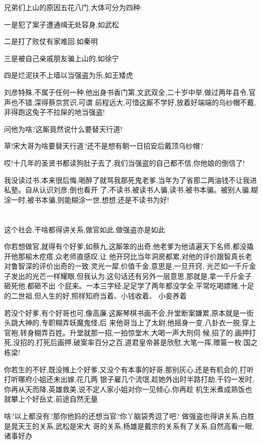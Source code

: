 ﻿\documentclass[12pt]{article}
\begin{document}
兄弟们上山的原因五花八门,大体可分为四种:

一是犯了案子遭通缉无处容身,如武松

二是打了败仗有家难回,如秦明

三是被自己亲戚朋友骗上山的,如徐宁

四是烂泥扶不上墙以当强盗为乐,如王矮虎

刘彦特殊,不属于任何一种,他出身书香门第,文武双全,二十岁中举,做过两年县令,官声也不错,深得蔡京赏识,可谓
前程远大,可惜这厮不学好,放着好端端的乌纱帽不戴,非得跑这兔子不拉屎的地当强盗!

问他为啥?这厮竟然说什么要替天行道!

草!宋大哥为啥要替天行道?还不是想有朝一日招安后戴顶乌纱帽?

哎!十几年的圣贤书都读狗肚子去了,我们当强盗的自己都不信,你他娘的倒信了!

我没读过书,本来很后悔,喝醉了就骂我那死鬼老爹,当年为了省那二两油钱不让我进私塾。自从认识刘彦,倒也看开
了,不读书,被读书人骗,读书,被书本骗。被别人骗,糊涂一时,被书本骗,则能糊涂一世,想想,还是不读书为好!

\section{}

这个社会,干啥都得讲关系,做官如此,做强盗亦是如此\dldots

你若想做官,就得有个好爹,如蔡九,这厮笨的出奇,他老爹为他请遍天下名师,都没撬开他那榆木疙瘩,众老师直感叹,让
他开窍比当年洞房都累,对他的评价跟智真长老对鲁智深的评价出奇的一致:灵光一犀,价值千金,意思是,一旦开窍,
光芒如一千斤金子发出的光芒一样耀眼,但我认为,这句话还有另外一层意思,那就是,拿一千斤金子砸死他,都砸不出
个屁来。一本三字经,足足学了两年都没学全,平常吃喝嫖赌,十足的二世祖,但人生的好,照样知府当着、小钱收着、
小妾养着\dldots

若没个好爹,有个好哥也可,像高廉,这厮琴棋书画不会,升堂断案嫌累,原本就是一街头跳大神的,专职糊弄妖魔鬼怪,后
来他哥当上了太尉,他摇身一变,八卦衣一脱,穿上官袍,转身糊弄百姓。升堂就那一招,一拍惊堂木,大喝一声大刑伺
候,招了的,画押打死,没招的,打死后画押,破案率百分之百,道君皇帝甚是欣慰,大笔一挥,赠匾一枚:国之栋梁!

你若生的不好,既没摊上个好爹,又没个有本事的好哥,那别灰心,还是有机会的,打听打听哪府小姐还未出嫁,花几两
银子雇几个流氓,趁她外出时半路打劫,千钧一发时,你再从天而降,英雄救美,说不定人家小姐对你一见倾心,你再趁
机生米煮成熟饭\dldots 也就攀上个好岳丈,前途自然无量

啥?以上都没有?那你他妈的还想当官?你丫脑袋秀逗了吧? 做强盗也得讲关系,白胜是晁天王的关系,武松是宋大
哥的关系,杨雄是戴宗的关系\dldots 有了关系,自然高看一眼,诸事好办\dldots
\end{document}
